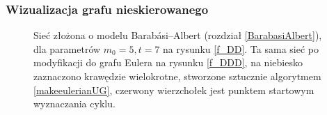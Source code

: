 \documentclass[a4paper, 12pt, twoside, openright]{article}
\begin{document}
\subsubsection{Wizualizacja grafu nieskierowanego}
	\begin{figure}[H]
			\centering
				\quad
		
		\caption[]{Sieć złożona o modelu Barabási–Albert (rozdział \ref{BarabasiAlbert}), dla parametrów $m_0=5, t=7$ na rysunku \ref{f_DD}. Ta sama sieć po modyfikacji do grafu Eulera na rysunku \ref{f_DDD}, na niebiesko zaznaczono krawędzie wielokrotne, stworzone sztucznie algorytmem \ref{makeeulerianUG}, czerwony wierzchołek jest punktem startowym wyznaczania cyklu.}
		\label{f_graph}
	\end{figure}	
	\captionsetup{justification=centering}
	
\end{document}
